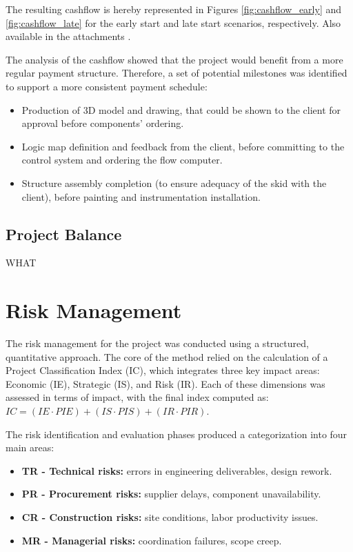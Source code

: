 The resulting cashflow is hereby represented in Figures \ref{fig:cashflow_early} and \ref{fig:cashflow_late} for the early start and late start scenarios, respectively. Also available in the attachments \cite{CashFlow1, CashFlow2}.

The analysis of the cashflow showed that the project would benefit from a more regular payment structure. Therefore, a set of potential milestones was identified to support a more consistent payment schedule:
\begin{itemize}
    \item Production of 3D model and drawing, that could be shown to the client for approval before components' ordering.
    \item Logic map definition and feedback from the client, before committing to the control system and ordering the flow computer.
    \item Structure assembly completion (to ensure adequacy of the skid with the client), before painting and instrumentation installation.
\end{itemize}

\subsection{Project Balance}
WHAT

\section{Risk Management}

The risk management for the project was conducted using a structured, quantitative approach. The core of the method relied on the calculation of a Project Classification Index (IC), which integrates three key impact areas: Economic (IE), Strategic (IS), and Risk (IR). Each of these dimensions was assessed in terms of impact, with the final index computed as:
$IC = (IE \cdot PIE) + (IS \cdot PIS) + (IR \cdot PIR)$.

The risk identification and evaluation phases produced a categorization into four main areas:
\begin{itemize}
    \item \textbf{TR - Technical risks:} errors in engineering deliverables, design rework.
    \item \textbf{PR - Procurement risks:} supplier delays, component unavailability.
    \item \textbf{CR - Construction risks:} site conditions, labor productivity issues.
    \item \textbf{MR - Managerial risks:} coordination failures, scope creep.
\end{itemize}

